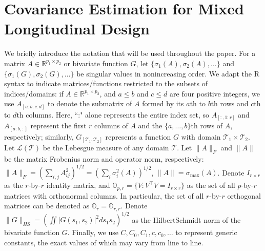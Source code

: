 \documentclass[11pt]{article}
\newcommand{\0}{{\mathbf{0}}}
\newcommand{\1}{{\mathbf{1}}}
\begin{document}
\section{Covariance Estimation for Mixed Longitudinal Design}\label{sec:method}

We briefly introduce the notation that will be used throughout the paper. For a matrix $A\in \mathbb{R}^{p_1\times p_2}$ or bivariate function $G$, let $\{\sigma_1(A), \sigma_2(A), \ldots\}$ and $\{\sigma_1(G), \sigma_2(G),\ldots\}$ be singular values in nonincreasing order. We adapt the R syntax to indicate matrices/functions restricted to the subsets of indices/domains: if $A\in \mathbb{R}^{p_1\times p_2}$, and $a\leq b$ and $c\leq d$ are four positive integers, we use $A_{[a:b, c:d]}$ to denote the submatrix of $A$ formed by its $a$th to $b$th rows and $c$th to $d$th columns. Here, ``:" alone represents the entire index set, so $A_{[:, 1:r]}$ and $A_{[a:b, :]}$ represent the first $r$ columns of $A$ and the $\{a,\ldots, b\}$th rows of $A$, respectively; similarly, $G_{[\mathcal{T}_1, \mathcal{T}_2]}$ represents a function $G$ with domain $\mathcal{T}_1\times \mathcal{T}_2$. Let $\mathcal{L}(\mathcal{T})$ be the Lebesgue measure of any domain $\mathcal{T}$. Let $\|A\|_{F}$ and $\|A\|$ be the matrix Frobenius norm and operator norm, respectively: $\|A\|_F = \left(\sum_{i, j}A_{ij}^2\right)^{1/2} = \left(\sum_{i}\sigma_i^2(A)\right)^{1/2}$, $\|A\| = \sigma_{\max}(A)$. Denote $I_{r\times r}$ as the $r$-by-$r$ identity matrix, and $\mathbb{O}_{p, r} = \{V: V^\top V = I_{r\times r}\}$ as the set of all $p$-by-$r$ matrices with orthonormal columns. In particular, the set of all $r$-by-$r$ orthogonal matrices can be denoted as $\mathbb{O}_r = \mathbb{O}_{r,r}$. Denote $\|G\|_{HS} = \left(\iint |G(s_1, s_2)|^2ds_1s_2\right)^{1/2}$ as the Hilbert\textendash Schmidt norm of the bivariate function $G$. Finally, we use $C, C_0, C_1, c, c_0, \ldots$ to represent generic constants, the exact values of which may vary from line to line.
\end{document}

